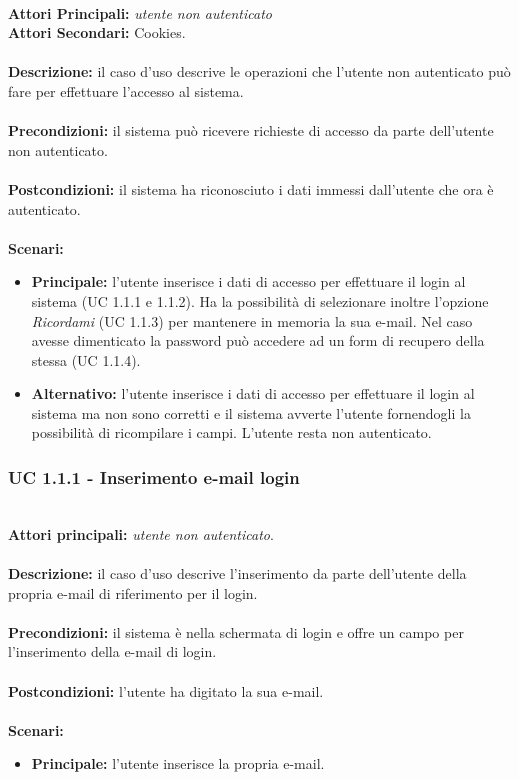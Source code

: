 \documentclass[a4paper,11pt]{article}
\begin{document}
\ \\
\textbf{Attori Principali:} \textit{utente non autenticato}
\\
\textbf{Attori Secondari:} Cookies.\\
\\
\textbf{Descrizione:} il caso d'uso descrive le operazioni che l'utente non autenticato può fare per effettuare l'accesso al sistema.\\
\\
\textbf{Precondizioni:} il sistema può ricevere richieste di accesso da parte dell'utente non autenticato.\\
\\
\textbf{Postcondizioni:} il sistema ha riconosciuto i dati immessi dall'utente che ora è autenticato.\\
\\
\textbf{Scenari:}
\begin{itemize}
\item \textbf{Principale: } l'utente inserisce i dati di accesso per effettuare il login al sistema (UC 1.1.1 e 1.1.2). Ha la possibilità di selezionare inoltre l'opzione \textit{Ricordami} (UC 1.1.3) per mantenere in memoria la sua e-mail. Nel caso avesse dimenticato la password può accedere ad un form di recupero della stessa (UC 1.1.4). 
\item \textbf{Alternativo: } l'utente inserisce i dati di accesso per effettuare il login al sistema ma non sono corretti e il sistema avverte l'utente fornendogli la possibilità di ricompilare i campi. L'utente resta non autenticato.
\end{itemize}

\vspace{6 mm}

\subsubsection{UC 1.1.1 - Inserimento e-mail login}
\ \\
\textbf{Attori principali:} \textit{utente non autenticato}.\\
\\
\textbf{Descrizione:} il caso d'uso descrive l'inserimento da parte dell'utente della propria e-mail di riferimento per il login. \\
\\
\textbf{Precondizioni:} il sistema è nella schermata di login e offre un campo per l'inserimento della e-mail di login.\\
\\
\textbf{Postcondizioni:} l'utente ha digitato la sua e-mail. \\
\\
\textbf{Scenari:}
\begin{itemize}
\item \textbf{Principale:} l'utente inserisce la propria e-mail.
\end{itemize}
\end{document}
